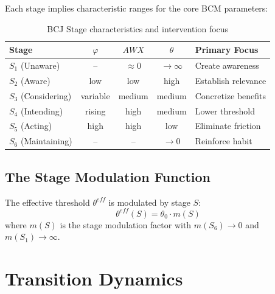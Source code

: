 Each stage implies characteristic ranges for the core BCM parameters:

\begin{table}[h]
\centering
\begin{tabular}{lcccl}
\toprule
\textbf{Stage} & $\varphi$ & $AWX$ & $\theta$ & \textbf{Primary Focus} \\
\midrule
$S_1$ (Unaware) & -- & $\approx 0$ & $\to \infty$ & Create awareness \\
$S_2$ (Aware) & low & low & high & Establish relevance \\
$S_3$ (Considering) & variable & medium & medium & Concretize benefits \\
$S_4$ (Intending) & rising & high & medium & Lower threshold \\
$S_5$ (Acting) & high & high & low & Eliminate friction \\
$S_6$ (Maintaining) & -- & -- & $\to 0$ & Reinforce habit \\
\bottomrule
\end{tabular}
\caption{BCJ Stage characteristics and intervention focus}
\label{tab:bcj-stages}
\end{table}

\subsection{The Stage Modulation Function}

\begin{definition}
The effective threshold $\theta^{eff}$ is modulated by stage $S$:
\begin{equation}
\theta^{eff}(S) = \theta_0 \cdot m(S)
\label{eq:theta-modulation}
\end{equation}
where $m(S)$ is the stage modulation factor with $m(S_6) \to 0$ and $m(S_1) \to \infty$.
\end{definition}



\section{Transition Dynamics}
\label{sec:bcj-transitions}


